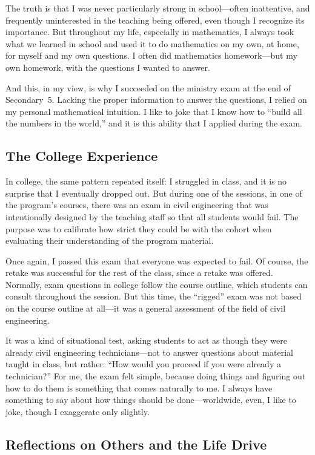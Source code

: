 \documentclass[12pt,oneside]{article}
\begin{document}
The truth is that I was never particularly strong in school—often inattentive, and frequently uninterested in the teaching being offered, even though I recognize its importance. But throughout my life, especially in mathematics, I always took what we learned in school and used it to do mathematics on my own, at home, for myself and my own questions. I often did mathematics homework—but my own homework, with the questions I wanted to answer.

And this, in my view, is why I succeeded on the ministry exam at the end of Secondary~5. Lacking the proper information to answer the questions, I relied on my personal mathematical intuition. I like to joke that I know how to “build all the numbers in the world,” and it is this ability that I applied during the exam.

\subsection{The College Experience}

In college, the same pattern repeated itself: I struggled in class, and it is no surprise that I eventually dropped out. But during one of the sessions, in one of the program’s courses, there was an exam in civil engineering that was intentionally designed by the teaching staff so that all students would fail. The purpose was to calibrate how strict they could be with the cohort when evaluating their understanding of the program material.

Once again, I passed this exam that everyone was expected to fail. Of course, the retake was successful for the rest of the class, since a retake was offered. Normally, exam questions in college follow the course outline, which students can consult throughout the session. But this time, the “rigged” exam was not based on the course outline at all—it was a general assessment of the field of civil engineering.

It was a kind of situational test, asking students to act as though they were already civil engineering technicians—not to answer questions about material taught in class, but rather: “How would you proceed if you were already a technician?” For me, the exam felt simple, because doing things and figuring out how to do them is something that comes naturally to me. I always have something to say about how things should be done—worldwide, even, I like to joke, though I exaggerate only slightly.

\subsection{Reflections on Others and the Life Drive}
\end{document}
